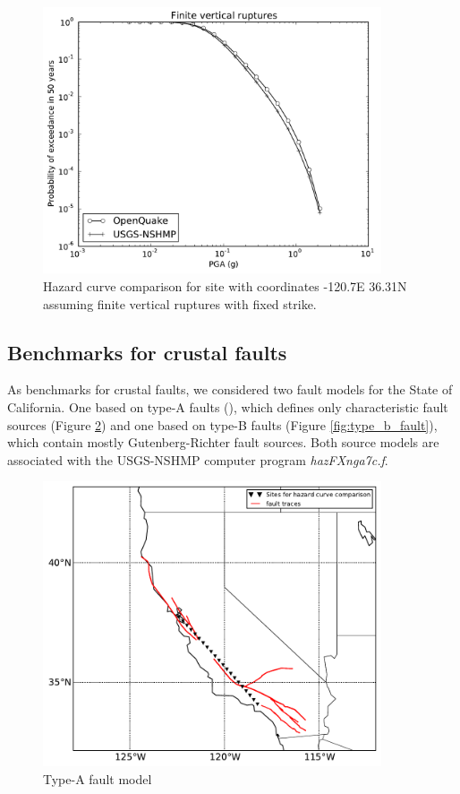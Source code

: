 \begin{figure}
\centering
\includegraphics[width=10cm]{./qareport/pictures/-120pt7_36pt31_fixedstrikevertical.pdf}
\caption{Hazard curve comparison for site with coordinates -120.7E 36.31N assuming finite vertical ruptures with fixed strike.}
\label{fig:cal_grid_curve_finite}
\end{figure}

\subsection{Benchmarks for crustal faults}
As benchmarks for crustal faults, we considered two fault models for the State of California. One based on type-A faults (\cite{petersen2008}), which defines only characteristic fault sources (Figure \ref{fig:type_a_fault}) and one based on type-B faults (Figure \ref{fig:type_b_fault}), which contain mostly Gutenberg-Richter fault sources. Both source models are associated with the USGS-NSHMP computer program \textit{hazFXnga7c.f}.

\begin{figure}[htb]
\centering
\includegraphics[width=10cm]{./qareport/pictures/aFault_aPriori_D2pt1.pdf}
\caption{Type-A fault model}
\label{fig:type_a_fault}
\end{figure}

